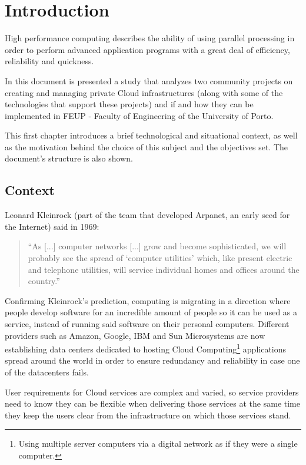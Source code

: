 \chapter{Introduction} \label{chap:intro}


High performance computing describes the ability of using parallel processing in order to perform advanced application programs with a great deal of efficiency, reliability and quickness. \cite{hpclinux}

In this document is presented a study that analyzes two community projects on creating and managing private Cloud infrastructures (along with some of the technologies that support these projects) and if and how they can be implemented in FEUP - Faculty of Engineering of the University of Porto.

This first chapter introduces a brief technological and situational context, as well as the motivation behind the choice of this subject and the objectives set. The document's structure is also shown.

\section{Context} \label{sec:context}

Leonard Kleinrock (part of the team that developed Arpanet, an early seed for the Internet) said in 1969:

\begin{quote}
  ``As [...] computer networks [...] grow and become sophisticated, we will probably see the spread of `computer utilities' which, like present electric and telephone utilities, will service individual homes and offices around the country.''~\cite{Buyya2009599} 
\end{quote}
	
Confirming Kleinrock's prediction, computing is migrating in a direction where people develop software for an incredible amount of people so it can be used as a service, instead of running said software on their personal computers. Different providers such as Amazon, Google, IBM and Sun Microsystems are now establishing data centers dedicated to hosting Cloud Computing\footnote{Using multiple server computers via a digital network as if they were a single computer.} applications spread around the world in order to ensure redundancy and reliability in case one of the datacenters fails. 

User requirements for Cloud services are complex and varied, so service providers need to know they can be flexible when delivering those services at the same time they keep the users clear from the infrastructure on which those services stand.

